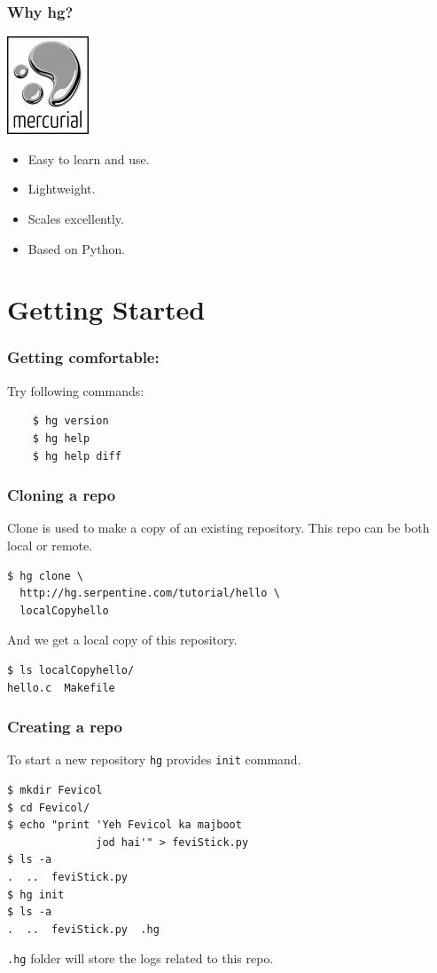 \documentclass[14pt,compress]{beamer}
\newcounter{time}
\newcommand{\inctime}[1]{\addtocounter{time}{#1}{\tiny \thetime\ m}}
\newcommand{\typ}[1]{\lstinline{#1}}
\begin{document}
\begin{frame}
  \frametitle{Why hg?}
    \includegraphics[height=.75in, interpolate=true]{mercurial}
  \begin{itemize}
  \item Easy to learn and use.
  \item Lightweight.
  \item Scales excellently.
  \item Based on Python.
  \end{itemize}
  \inctime{10}
\end{frame}

\section{Getting Started}

\begin{frame}[fragile]
  \frametitle{Getting comfortable:}
  Try following commands:
  \begin{lstlisting}
    $ hg version    
    $ hg help
    $ hg help diff
  \end{lstlisting} %
\end{frame}

\begin{frame}[fragile]
  \frametitle{Cloning a repo}
  Clone is used to make a copy of an existing repository. This repo can be both local or remote.
  \begin{lstlisting}
$ hg clone \
  http://hg.serpentine.com/tutorial/hello \
  localCopyhello
  \end{lstlisting}
  And we get a local copy of this repository. 
  \begin{lstlisting}
$ ls localCopyhello/
hello.c  Makefile
  \end{lstlisting}
\end{frame}

\begin{frame}[fragile]
  \frametitle{Creating a repo}
  To start a new repository \typ{hg} provides \typ{init} command.
  \begin{lstlisting}
$ mkdir Fevicol
$ cd Fevicol/
$ echo "print 'Yeh Fevicol ka majboot 
              jod hai'" > feviStick.py
$ ls -a
.  ..  feviStick.py
$ hg init
$ ls -a
.  ..  feviStick.py  .hg
  \end{lstlisting}
\typ{.hg} folder will store the logs related to this repo.
\end{frame}
\end{document}
